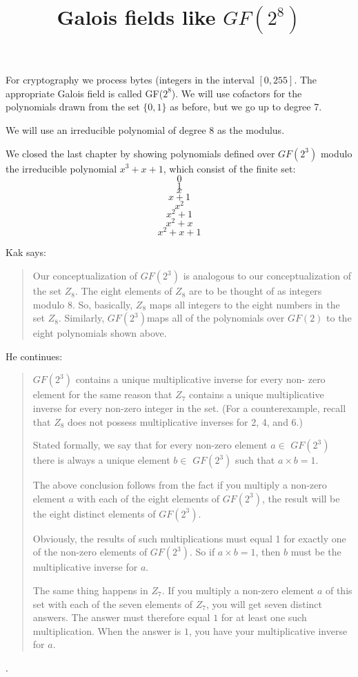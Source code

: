 \documentclass[11pt, oneside]{article}
\title{Galois fields like $GF(2^8)$}
\date{}
\begin{document}
\maketitle
\Large

For cryptography we process bytes (integers in the interval $[0,255]$.  The appropriate Galois field is called GF($2^8$).  We will use cofactors for the polynomials drawn from the set $\{0,1\}$ as before, but we go up to degree 7.

We will use an irreducible polynomial of degree 8 as the modulus.

We closed the last chapter by showing polynomials defined over $GF(2^3)$ modulo the irreducible polynomial $x^3 + x + 1$, which consist of the finite set:
\[ 0 \]
\[ 1 \]
\[ x \]
\[ x + 1 \]
\[ x^2 \]
\[ x^2 + 1 \]
\[ x^2 + x \]
\[ x^2 + x + 1 \]


Kak says:

\begin{quote} Our conceptualization of $GF(2^3)$ is analogous to our conceptualization of the set $Z_8$. The eight elements of $Z_8$ are to be thought of as integers modulo 8. So, basically, $Z_8$ maps all integers to the eight numbers in the set $Z_8$. Similarly, $GF(2^3)$maps all of the polynomials over $GF(2)$ to the eight polynomials shown above.\end{quote}

He continues:

\begin{quote}$GF(2^3)$ contains a unique multiplicative inverse for every non- zero element for the same reason that $Z_7$ contains a unique multiplicative inverse for every non-zero integer in the set. (For a counterexample, recall that $Z_8$ does not possess multiplicative inverses for 2, 4, and 6.) 

Stated formally, we say that for every non-zero element $a \in$ $GF(2^3)$ there is always a unique element $b \in$ $GF(2^3)$ such that $a \times b = 1$.

The above conclusion follows from the fact if you multiply a non-zero element $a$ with each of the eight elements of $GF(2^3)$, the result will be the eight distinct elements of $GF(2^3)$. 

Obviously, the results of such multiplications must equal 1 for exactly one of the non-zero elements of $GF(2^3)$. So if $a \times b = 1$, then $b$ must be the multiplicative inverse for $a$.

The same thing happens in $Z_7$. If you multiply a non-zero element $a$ of this set with each of the seven elements of $Z_7$, you will get seven distinct answers. The answer must therefore equal $1$ for at least one such multiplication. When the answer is $1$, you have your multiplicative inverse for $a$.\end{quote}.
\end{document}
